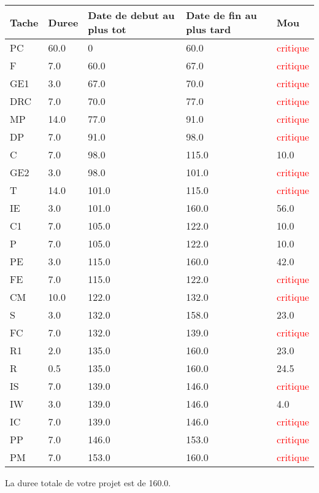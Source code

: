 \documentclass{article}
\begin{document}
\begin{tabular}{|l|l|l|l|l|}
\hline 
Tache & Duree & Date de debut au plus tot & Date de fin au plus tard & Mou\tabularnewline
\hline

PC&60.0&0&60.0&\textcolor{red}{critique}\tabularnewline
\hline
F&7.0&60.0&67.0&\textcolor{red}{critique}\tabularnewline
\hline
GE1&3.0&67.0&70.0&\textcolor{red}{critique}\tabularnewline
\hline
DRC&7.0&70.0&77.0&\textcolor{red}{critique}\tabularnewline
\hline
MP&14.0&77.0&91.0&\textcolor{red}{critique}\tabularnewline
\hline
DP&7.0&91.0&98.0&\textcolor{red}{critique}\tabularnewline
\hline
C&7.0&98.0&115.0&10.0\tabularnewline
\hline
GE2&3.0&98.0&101.0&\textcolor{red}{critique}\tabularnewline
\hline
T&14.0&101.0&115.0&\textcolor{red}{critique}\tabularnewline
\hline
IE&3.0&101.0&160.0&56.0\tabularnewline
\hline
C1&7.0&105.0&122.0&10.0\tabularnewline
\hline
P&7.0&105.0&122.0&10.0\tabularnewline
\hline
PE&3.0&115.0&160.0&42.0\tabularnewline
\hline
FE&7.0&115.0&122.0&\textcolor{red}{critique}\tabularnewline
\hline
CM&10.0&122.0&132.0&\textcolor{red}{critique}\tabularnewline
\hline
S&3.0&132.0&158.0&23.0\tabularnewline
\hline
FC&7.0&132.0&139.0&\textcolor{red}{critique}\tabularnewline
\hline
R1&2.0&135.0&160.0&23.0\tabularnewline
\hline
R&0.5&135.0&160.0&24.5\tabularnewline
\hline
IS&7.0&139.0&146.0&\textcolor{red}{critique}\tabularnewline
\hline
IW&3.0&139.0&146.0&4.0\tabularnewline
\hline
IC&7.0&139.0&146.0&\textcolor{red}{critique}\tabularnewline
\hline
PP&7.0&146.0&153.0&\textcolor{red}{critique}\tabularnewline
\hline
PM&7.0&153.0&160.0&\textcolor{red}{critique}\tabularnewline
\hline

\end{tabular}
La duree totale de votre projet est de 160.0.
\end{document}
